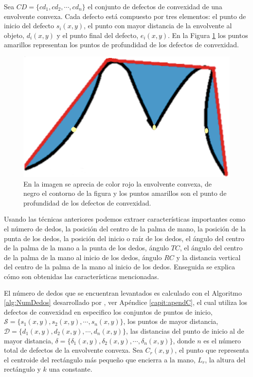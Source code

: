 Sea $CD=\lbrace cd_1, cd_2, \cdots, cd_n \rbrace$ el conjunto de defectos de convexidad de una envolvente convexa. Cada defecto está compuesto por tres elementos: el punto de inicio del defecto $s_i(x,y)$, el punto con mayor distancia de la envolvente al objeto, $d_i(x,y)$ y el punto final del defecto, $e_i(x,y)$.
En la Figura \ref{fig:FigConvexHullDefects} los puntos amarillos representan los puntos de profundidad de los defectos de convexidad. 

\begin{figure}[h!]
\begin{center}
\includegraphics[scale=.4]{./Figures/ConvexHullAndDefects.png}
\end{center}
\caption{En la imagen se aprecia de color rojo la envolvente convexa, de negro el contorno de la figura y los puntos amarillos son el punto de profundidad de los defectos de convexidad.}
\label{fig:FigConvexHullDefects}
\end{figure}  

Usando las técnicas anteriores podemos extraer características importantes como el número de dedos, la posición del centro de la palma de mano, la posición de la punta de los dedos, la posición del inicio o raíz de los dedos, el ángulo del centro de la palma de la mano a la punta de los dedos, ángulo $TC$, el ángulo del centro de la palma de la mano al inicio de los dedos, ángulo $RC$ y la distancia vertical del centro de la palma de la mano al inicio de los dedos. Enseguida se explica cómo son obtenidas las características mencionadas. 

El número de dedos que se encuentran levantados es calculado con el Algoritmo \ref{alg:NumDedos} desarrollado por \citep{Kathuria2011}, ver Apéndice \ref{capit:apendC}, el cual utiliza los defectos de convexidad en especifico los conjuntos de puntos de inicio, $\mathcal{S}=\lbrace s_1(x,y), s_2(x,y), \cdots, s_n(x,y) \rbrace$, los puntos de mayor distancia, $\mathcal{D}=\lbrace d_1(x,y), d_2(x,y), \cdots, d_n(x,y) \rbrace$, las distancias del punto de inicio al de mayor distancia, $\mathcal{\delta}=\lbrace \delta_1(x,y), \delta_2(x,y), \cdots, \delta_n(x,y) \rbrace$, donde $n$ es el número total de defectos de la envolvente convexa.
Sea $C_r(x,y)$, el punto que representa el centroide del rectángulo más pequeño que encierra a la mano, $L_r$, la altura del rectángulo y $k$ una constante. 

